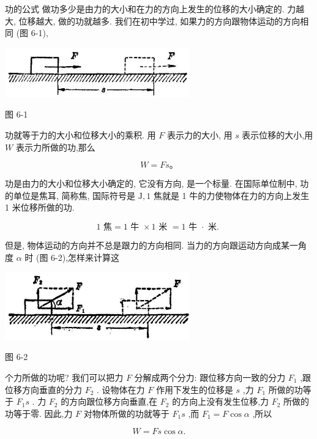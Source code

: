 \documentclass[10pt]{article}
\begin{document}
功的公式 做功多少是由力的大小和在力的方向上发生的位移的大小确定的. 力越大, 位移越大, 做的功就越多. 我们在初中学过, 如果力的方向跟物体运动的方向相同 (图 6-1),

\begin{center}
\includegraphics[max width=0.6\textwidth]{images/01912d55-147c-70aa-b0e0-1782a122f948_168_745855.jpg}
\end{center}

图 6-1

功就等于力的大小和位移大小的乘积. 用 \(F\) 表示力的大小, 用 \(s\) 表示位移的大小,用 \(W\) 表示力所做的功,那么

\[
W = {Fs}\text{。}
\]

功是由力的大小和位移大小确定的, 它没有方向, 是一个标量. 在国际单位制中, 功的单位是焦耳, 简称焦, 国际符号是 \(\mathrm{J},1\) 焦就是 1 牛的力使物体在力的方向上发生 1 米位移所做的功.

\[
\text{1 焦} = 1\text{ 牛 } \times 1\text{ 米 } = 1\text{ 牛 } \cdot \text{ 米. }
\]

但是, 物体运动的方向并不总是跟力的方向相同. 当力的方向跟运动方向成某一角度 \(\alpha\) 时 (图 6-2),怎样来计算这

\begin{center}
\includegraphics[max width=0.6\textwidth]{images/01912d55-147c-70aa-b0e0-1782a122f948_168_305772.jpg}
\end{center}

图 6-2

个力所做的功呢? 我们可以把力 \(F\) 分解成两个分力: 跟位移方向一致的分力 \({F}_{1}\) ,跟位移方向垂直的分力 \({F}_{2}\) . 设物体在力 \(F\) 作用下发生的位移是 \(s\) ,力 \({F}_{1}\) 所做的功等于 \({F}_{1}s\) . 力 \({F}_{2}\) 的方向跟位移方向垂直,在 \({F}_{2}\) 的方向上没有发生位移,力 \({F}_{2}\) 所做的功等于零. 因此,力 \(F\) 对物体所做的功就等于 \({F}_{1}s\) ,而 \({F}_{1} = F\cos \alpha\) ,所以

\[
W = {Fs}\cos \alpha .
\]
\end{document}
